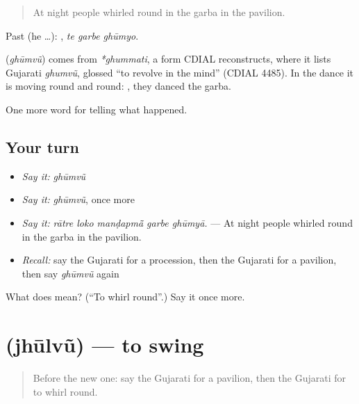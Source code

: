 \begin{quote}
At night people whirled round in the garba in the pavilion.
\end{quote}

Past (he …):   , \emph{te garbe ghūmyo}.

\begin{cousinweb}
\textbf{} (\emph{ghūmvũ}) comes from \emph{*ghummati}, a form CDIAL reconstructs, where it lists Gujarati \emph{ghumvũ}, glossed \textquotedblleft{}to revolve in the mind\textquotedblright{} (CDIAL 4485). In the dance it is moving round and round: \textbf{ }, they danced the garba.
\end{cousinweb}

\begin{grammarlens}[title={What you've built}]
One more word for telling what happened.
\end{grammarlens}

\subsection*{Your turn}
\begin{itemize}
\raggedright
  \item \emph{Say it:} \emph{ghūmvũ}
  \item \emph{Say it:} \emph{ghūmvũ}, once more
  \item \emph{Say it:} \emph{rātre loko manḍapmā̃ garbe ghūmyā.} — At night people whirled round in the garba in the pavilion.
  \item \emph{Recall:} say the Gujarati for a procession, then the Gujarati for a pavilion, then say \emph{ghūmvũ} again
\end{itemize}

\begin{tcolorbox}[breakable,colback=teal!4,colframe=teal!35!black,title={Before you move on}]
What does  mean? (\textquotedblleft{}To whirl round\textquotedblright{}.) Say it once more.
\end{tcolorbox}
\section[\texorpdfstring{\gu{ઝૂલવું} (jhūlvũ)}{ઝૂલવું (jhūlvũ)}]{ (jhūlvũ) — to swing}

\label{lesson:GU-C330-jhulvu}



\begin{quote}
Before the new one: say the Gujarati for a pavilion, then the Gujarati for to whirl round.
\end{quote}

